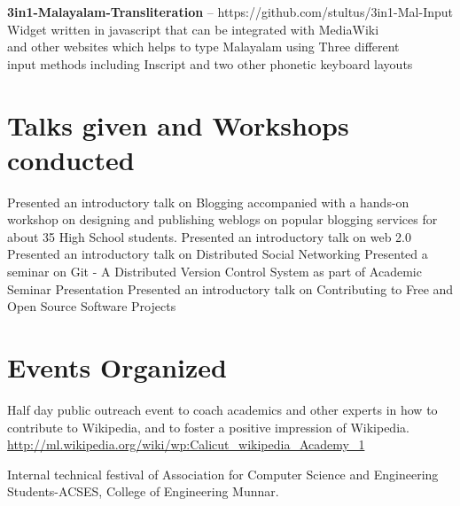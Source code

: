 \documentclass[11pt,a4paper]{moderncv}
\begin{document}
\cvlistitem
{\textbf{3in1-Malayalam-Transliteration} -- {\small https://github.com/stultus/3in1-Mal-Input}
  \\Widget written in javascript that can be integrated with MediaWiki \\
    and other websites which helps to type Malayalam using Three different\\
    input methods including Inscript and two other phonetic keyboard layouts
}





\section{Talks given and Workshops conducted}
{Presented an introductory talk on Blogging accompanied with a hands-on workshop on designing and  publishing weblogs on popular blogging services for about 35 High School students.}
{Presented an introductory talk on web 2.0} 
{Presented an introductory talk on Distributed Social Networking} 
{Presented a seminar on Git - A Distributed Version Control System as part of Academic Seminar Presentation}
{Presented an introductory talk on Contributing to Free and Open Source Software Projects}  

\section{Events Organized}

{Half day public outreach event to coach academics and other experts in how to contribute to Wikipedia, and to foster a positive impression of Wikipedia.\\
 \url{http://ml.wikipedia.org/wiki/wp:Calicut_wikipedia_Academy_1}}

{Internal technical festival of Association for Computer Science and Engineering Students-ACSES, College of Engineering Munnar.}
\end{document}
